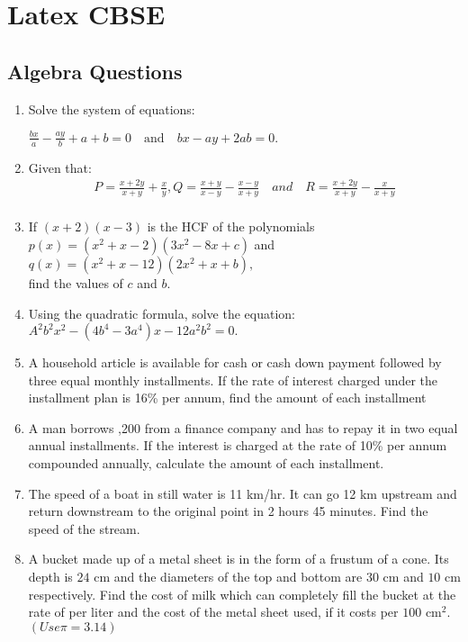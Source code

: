 \documentclass{article}
\begin{document}
\section{Latex CBSE}
\subsection{Algebra Questions}
\begin{enumerate}

\item \textbf{}Solve the system of equations:

$\frac{bx}{a} - \frac{a y}{b} + a + b = 0 \quad \text{and} \quad b x - a y + 2ab = 0.$

\item Given that:\\
\begin{align*}
P = \frac{x+2y}{x+y} + \frac{x}{y}, Q=\frac{x+y}{x-y}-\frac{x-y}{x+y}\quad and \quad R=\frac{x+2y}{x+y} - \frac{x}{x+y}  \\
\end{align*}

\item If $(x + 2)(x - 3)$ is the HCF of the polynomials $p(x) = (x^2 + x - 2)(3x^2 - 8x + c)$ and $q(x) = (x^2 + x - 12)(2x^2 + x + b),$ \\
find the values of $c$ and $b$.

\item  Using the quadratic formula, solve the equation: $A^2 b^2 x^2 - (4b^4 - 3a^4) x - 12 a^2 b^2 = 0.$

\item  A household article is available for  cash or  cash down payment followed by three equal monthly installments. If the rate of interest charged under the installment plan is 16\% per annum, find the amount of each installment \\

\item A man borrows ,200 from a finance company and has to repay it in two equal annual installments. If the interest is charged at the rate of 10\% per annum compounded annually, calculate the amount of each installment.

\item The speed of a boat in still water is 11 km/hr. It can go 12 km upstream and return 
downstream to the original point in 2 hours 45 minutes. Find the speed of the stream.

\item A bucket made up of a metal sheet is in the form of a frustum of a cone. Its depth is $24\text{ cm}$ and the diameters of the top and bottom are $30\text{ cm}$ and $10\text{ cm}$ respectively. Find the cost of milk which can completely fill the bucket at the rate of  per liter and the cost of the metal sheet used, if it costs  per $100\text{ cm}^2$. $(Use \pi=3.14)$



\end{enumerate}
\end{document}
